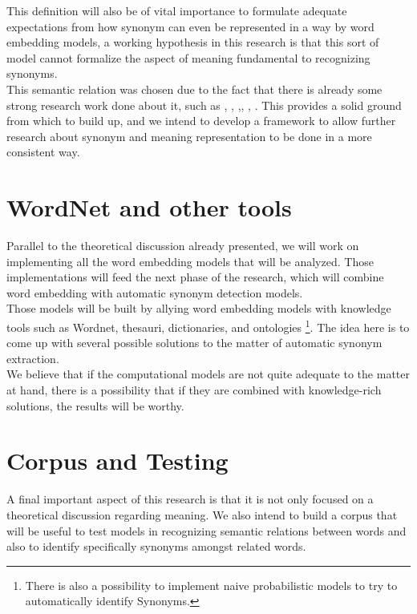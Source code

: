\documentclass[runningheads]{llncs}
\begin{document}
This definition will also be of vital importance to formulate adequate expectations from how synonym can even be represented in a way by word embedding models, a working hypothesis in this research is that this sort of model cannot formalize the aspect of meaning fundamental to recognizing synonyms.\\ 

This semantic relation was chosen due to the fact that there is already some strong research work done about it, such as \cite{fellbaum1998}, \cite{scheible2013uncovering}, \cite{lin2003},\cite{muller2006}, \cite{wang2009}, \cite{thalenberg2017}. This provides a solid ground from which to build up, and we intend to develop a framework to allow further research about synonym and meaning representation to be done in a more consistent way.\\

\section{WordNet and other tools}

Parallel to the theoretical discussion already presented, we will work on implementing all the word embedding models that will be analyzed. Those implementations will feed the next phase of the research, which will combine word embedding with automatic synonym detection models.\\

Those models will be built by allying word embedding models with knowledge tools such as Wordnet, thesauri, dictionaries, and ontologies \footnote{There is also a possibility to implement naive probabilistic models to try to automatically identify Synonyms.}. The idea here is to come up with several possible solutions to the matter of automatic synonym extraction.\\

We believe that if the computational models are not quite adequate to the matter at hand, there is a possibility that if they are combined with knowledge-rich solutions, the results will be worthy.\\


\section{Corpus and Testing}

A final important aspect of this research is that it is not only focused on a theoretical discussion regarding meaning. We also intend to build a corpus that will be useful to test models in recognizing semantic relations between words and also to identify specifically synonyms amongst related words.\\
\end{document}
